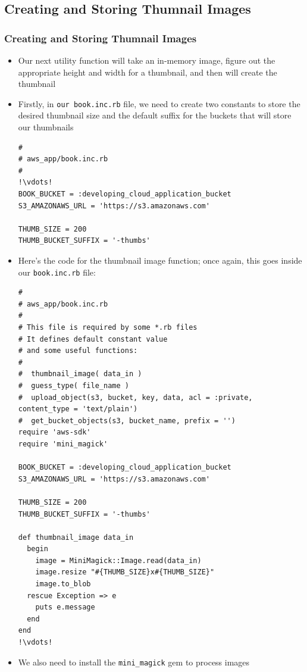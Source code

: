 \documentclass{beamer}
\begin{document}
\subsection{Creating and Storing Thumnail Images}
\begin{frame}
\frametitle{Creating and Storing Thumnail Images}
\begin{itemize}
\item Our next utility function will take an in-memory image, figure out the appropriate
height and width for a thumbnail, and then will create the thumbnail
\item Firstly, in \texttt{our book.inc.rb} file, we need to create two constants to store the
desired thumbnail size and the default suffix for the buckets that will store our thumbnails

\lstset{language=Ruby, style=eclipse}
\begin{lstlisting}[escapechar=!]
#
# aws_app/book.inc.rb
#
!\vdots!
BOOK_BUCKET = :developing_cloud_application_bucket
S3_AMAZONAWS_URL = 'https://s3.amazonaws.com'

THUMB_SIZE = 200
THUMB_BUCKET_SUFFIX = '-thumbs'
\end{lstlisting}

\item Here’s the code for the thumbnail image function; once again, this goes inside our \texttt{book.inc.rb} file:
\lstset{language=Ruby, style=eclipse}
\begin{lstlisting}[escapechar=!]
#
# aws_app/book.inc.rb
#
# This file is required by some *.rb files
# It defines default constant value
# and some useful functions:
#
#  thumbnail_image( data_in )
#  guess_type( file_name )
#  upload_object(s3, bucket, key, data, acl = :private, content_type = 'text/plain')
#  get_bucket_objects(s3, bucket_name, prefix = '')
require 'aws-sdk'
require 'mini_magick'

BOOK_BUCKET = :developing_cloud_application_bucket
S3_AMAZONAWS_URL = 'https://s3.amazonaws.com'

THUMB_SIZE = 200
THUMB_BUCKET_SUFFIX = '-thumbs'

def thumbnail_image data_in
  begin
    image = MiniMagick::Image.read(data_in)
    image.resize "#{THUMB_SIZE}x#{THUMB_SIZE}"
    image.to_blob
  rescue Exception => e
    puts e.message
  end
end
!\vdots!
\end{lstlisting}

\item We also need to install the \texttt{mini\_magick} gem to process images


\end{itemize}
\end{frame}
\end{document}
